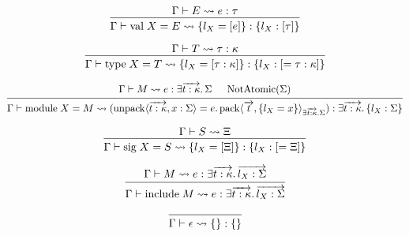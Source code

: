 \documentclass[lualatex,12pt,unicode]{article}
\begin{document}
\pagestyle{empty}

\[
    \begin{prooftree}
        \hypo{\Gamma \vdash E \rightsquigarrow e: \tau}
        \infer1{\Gamma \vdash \mathrm{val}\; X = E \rightsquigarrow \{l_X = [e]\}: \{l_X: [\tau]\}}
    \end{prooftree}
\]

\[
    \begin{prooftree}
        \hypo{\Gamma \vdash T \rightsquigarrow \tau: \kappa}
        \infer1{\Gamma \vdash \mathrm{type}\; X = T \rightsquigarrow \{l_X = [\tau: \kappa]\}: \{l_X: [= \tau: \kappa]\}}
    \end{prooftree}
\]

\[
    \begin{prooftree}
        \hypo{\Gamma \vdash M \rightsquigarrow e: \exists \overrightarrow{t: \kappa}\ldotp \Sigma}
        \hypo{\mathrm{NotAtomic}(\Sigma)}
        \infer2{\Gamma \vdash \mathrm{module}\; X = M \rightsquigarrow (\mathrm{unpack}\langle \overrightarrow{t: \kappa}, x: \Sigma\rangle = e\ldotp \mathrm{pack}\langle \overrightarrow{t}, \{l_X = x\}\rangle_{\exists \overrightarrow{t: \kappa}\ldotp \Sigma}): \exists \overrightarrow{t: \kappa}\ldotp \{l_X: \Sigma\}}
    \end{prooftree}
\]

\[
    \begin{prooftree}
        \hypo{\Gamma \vdash S \rightsquigarrow \Xi}
        \infer1{\Gamma \vdash \mathrm{sig}\; X = S \rightsquigarrow \{l_X = [\Xi]\}: \{l_X: [= \Xi]\}}
    \end{prooftree}
\]

\[
    \begin{prooftree}
        \hypo{\Gamma \vdash M \rightsquigarrow e: \exists \overrightarrow{t: \kappa}\ldotp \overrightarrow{l_X: \Sigma}}
        \infer1{\Gamma \vdash \mathrm{include}\; M \rightsquigarrow e: \exists \overrightarrow{t: \kappa}\ldotp \overrightarrow{l_X: \Sigma}}
    \end{prooftree}
\]

\[
    \begin{prooftree}
        \infer0{\Gamma \vdash \epsilon \rightsquigarrow \{\}: \{\}}
    \end{prooftree}
\]
\end{document}

